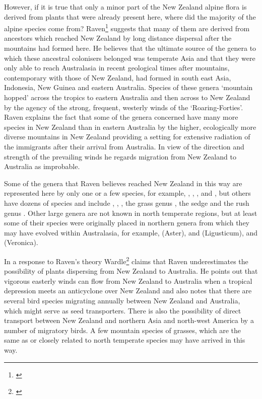 However, if it is true that only a minor part of the New Zealand alpine flora is derived from plants that were already present here, where did the majority of the alpine species come from? Raven\footnote{\cite{raven1973evolution}} suggests that many of them are derived from ancestors which reached New Zealand by long distance dispersal after the mountains had formed here.
He believes that the ultimate source of the genera to which these ancestral colonisers belonged was temperate Asia and that they were only able to reach Australasia in recent geological times after mountains, contemporary with those of New Zealand, had formed in south east Asia, Indonesia, New Guinea and eastern Australia.
Species of these genera `mountain hopped' across the tropics to eastern Australia and then across to New Zealand by the agency of the strong, frequent, westerly winds of the `Roaring-Forties'.
Raven explains the fact that some of the genera concerned have many more species in New Zealand than in eastern Australia by the higher, ecologically more diverse mountains in New Zealand providing a setting for extensive radiation of the immigrants after their arrival from Australia.
In view of the direction and strength of the prevailing winds he regards migration from New Zealand to Australia as improbable.

Some of the genera that Raven believes reached New Zealand in this way are represented here by only one or a few species, for example, , , ,  and , but others have dozens of species and include , , , the grass genus , the sedge  and the rush genus .
Other large genera are not known in north temperate regions, but at least some of their species were originally placed in northern genera from which they may have evolved within Australasia, for example,  (Aster),  and  (Ligusticum), and  (Veronica).

In a response to Raven's theory Wardle\footnote{\cite{wardle1978origin}} claims that Raven underestimates the possibility of plants dispersing from New Zealand to Australia.
He points out that vigorous easterly winds can flow from New Zealand to Australia when a tropical depression meets an anticyclone over New Zealand and also notes that there are several bird species migrating annually between New Zealand and Australia, which might serve as seed transporters.
There is also the possibility of direct transport between New Zealand and northern Asia and north-west America by a number of migratory birds.
A few mountain species of grasses, which are the same as or closely related to north temperate species may have arrived in this way.

